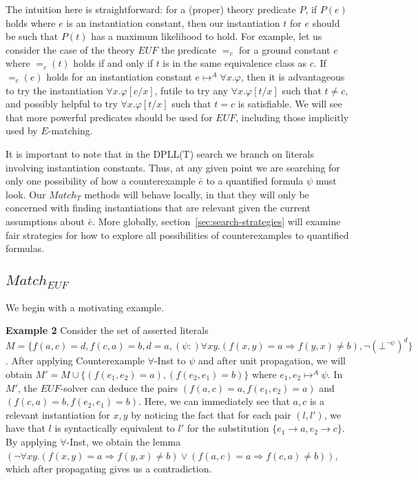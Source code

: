 \documentclass{llncs}
\begin{document}
The intuition here is straightforward: for a (proper) theory predicate $P$, if $P(e)$ holds where $e$ is an instantiation constant, then our instantiation $t$ for $e$ should be such that $P( t )$ has a maximum likelihood to hold.
For example, let us consider the case of the theory $EUF$ the predicate $=_c$ for a ground constant $c$ where $=_c( t )$ holds if and only if $t$ is in the same equivalence class as $c$.
If $=_c( e )$ holds for an instantiation constant $e \mapsto^A \forall x. \varphi$, then it is advantageous to try the instantiation $\forall x. \varphi[c/x]$, futile to try any $\forall x. \varphi[t/x]$ such that $t \neq c$, and possibly helpful to try $\forall x. \varphi[t/x]$ such that $t = c$ is satisfiable.
We will see that more powerful predicates should be used for $EUF$, including those implicitly used by $E$-matching.

It is important to note that in the DPLL(T) search we branch on literals involving instantiation constants.
Thus, at any given point we are searching for only one possibility of how a counterexample $\bar{e}$ to a quantified formula $\psi$ must look.
Our $Match_T$ methods will behave locally, in that they will only be concerned with finding instantiations that are relevant given the current assumptions about $\bar{e}$.
More globally, section~\ref{sec:search-strategies} will examine fair strategies for how to explore all possibilities of counterexamples to quantified formulas.

\subsection{$Match_{EUF}$}

We begin with a motivating example.

{\bf Example 2}
Consider the set of asserted literals $M = \{ f( a, c ) = d, f( c, a ) = b, d = a, (\psi :) \forall xy. (f( x, y ) = a \Rightarrow f( y, x ) \neq b), \neg ( \bot^{\neg \psi} )^d \}$.
After applying Counterexample $\forall$-Inst to $\psi$ and after unit propagation, we will obtain $M' = M \cup \{ (f( e_1, e_2 ) = a), (f( e_2, e_1 ) = b) \}$ where $e_1, e_2 \mapsto^A \psi$.
In $M'$, the $EUF$-solver can deduce the pairs $( f( a, c ) = a, f( e_1, e_2 ) = a )$ and $( f( c, a ) = b,  f( e_2, e_1 ) = b )$.
Here, we can immediately see that $a, c$ is a relevant instantiation for $x, y$ by noticing the fact that for each pair $( l, l')$, we have that $l$ is syntactically equivalent to $l'$ for the substitution $\{ e_1 \rightarrow a, e_2 \rightarrow c \}$.
By applying $\forall$-Inst, we obtain the lemma $(\neg \forall xy. (f( x, y ) = a \Rightarrow f( y, x ) \neq b) \vee ( f( a, c ) = a \Rightarrow f( c, a ) \neq b ))$, which after propagating gives us a contradiction. \\
\end{document}

